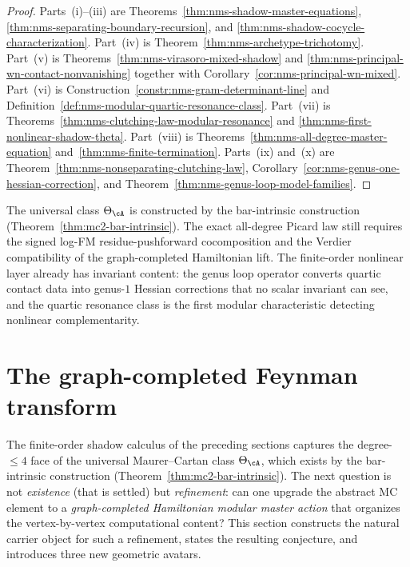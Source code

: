 \begin{proof}
Parts~(i)--(iii) are Theorems~\ref{thm:nms-shadow-master-equations}, \ref{thm:nms-separating-boundary-recursion}, and \ref{thm:nms-shadow-cocycle-characterization}. Part~(iv) is Theorem~\ref{thm:nms-archetype-trichotomy}. Part~(v) is Theorems~\ref{thm:nms-virasoro-mixed-shadow} and \ref{thm:nms-principal-wn-contact-nonvanishing} together with Corollary~\ref{cor:nms-principal-wn-mixed}. Part~(vi) is Construction~\ref{constr:nms-gram-determinant-line} and Definition~\ref{def:nms-modular-quartic-resonance-class}. Part~(vii) is Theorems~\ref{thm:nms-clutching-law-modular-resonance} and \ref{thm:nms-first-nonlinear-shadow-theta}. Part~(viii) is Theorems~\ref{thm:nms-all-degree-master-equation} and~\ref{thm:nms-finite-termination}. Parts~(ix) and~(x) are Theorem~\ref{thm:nms-nonseparating-clutching-law}, Corollary~\ref{cor:nms-genus-one-hessian-correction}, and Theorem~\ref{thm:nms-genus-loop-model-families}.\qedhere
\end{proof}

\begin{remark}
\label{rem:nms-what-remains}
The universal class $\Theta_{\cA}$ is constructed by the bar-intrinsic
construction (Theorem~\ref{thm:mc2-bar-intrinsic}). The exact
all-degree Picard law still requires the signed log-FM
residue-pushforward cocomposition and the Verdier compatibility of the
graph-completed Hamiltonian lift. The finite-order nonlinear layer
already has invariant content: the genus loop operator converts
quartic contact data into genus-$1$ Hessian corrections that no scalar
invariant can see, and the quartic resonance class is the first modular
characteristic detecting nonlinear complementarity.
\end{remark}

\section{The graph-completed Feynman transform}
\label{sec:nms-feynman-transform-theory}

The finite-order shadow calculus of the preceding sections captures the degree-$\le 4$ face of the universal Maurer--Cartan class $\Theta_\cA$, which exists by the bar-intrinsic construction (Theorem~\ref{thm:mc2-bar-intrinsic}). The next question is not \emph{existence} (that is settled) but \emph{refinement}: can one upgrade the abstract MC element to a \emph{graph-completed Hamiltonian modular master action} that organizes the vertex-by-vertex computational content? This section constructs the natural carrier object for such a refinement, states the resulting conjecture, and introduces three new geometric avatars.

